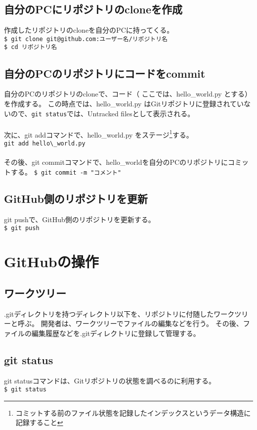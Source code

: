 \documentclass[11pt, oneside]{article}   	%
\begin{document}
\subsection{自分のPCにリポジトリのcloneを作成}
作成したリポジトリのcloneを自分のPCに持ってくる。\\
\verb|$ git clone git@github.com:ユーザー名/リポジトリ名|\\
\verb|$ cd リポジトリ名|\\

\subsection{自分のPCのリポジトリにコードをcommit}
自分のPCのリポジトリのcloneで、コード（ ここでは、hello\_world.py とする）を作成する。
この時点では、hello\_world.py はGitリポジトリに登録されていないので、\verb|git status|では、Untracked filesとして表示される。\\
　\\
次に、git addコマンドで、hello\_world.py をステージ\footnote{コミットする前のファイル状態を記録したインデックスというデータ構造に記録すること}する。\\
\verb|git add hello\_world.py|\\
　\\
その後、git commitコマンドで、hello\_worldを自分のPCのリポジトリにコミットする。
\verb|$ git commit -m "コメント"|\\

\subsection{GitHub側のリポジトリを更新}
git pushで、GitHub側のリポジトリを更新する。\\
\verb|$ git push|\\


\section{GitHubの操作}
\subsection{ワークツリー}
.gitディレクトリを持つディレクトリ以下を、リポジトリに付随したワークツリーと呼ぶ。
開発者は、ワークツリーでファイルの編集などを行う。
その後、ファイルの編集履歴などを.gitディレクトリに登録して管理する。\\

\subsection{git status}
git statusコマンドは、Gitリポジトリの状態を調べるのに利用する。\\
\verb|$ git status|\\
\end{document}
